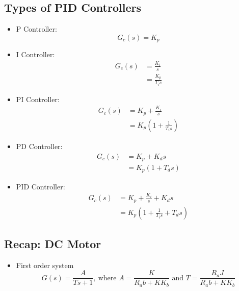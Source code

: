 \documentclass[a4paper]{article}
\begin{document}
\subsection{Types of PID Controllers}
\begin{itemize}
    \item P Controller: $$G_c(s) = K_p$$
    \item I Controller:
    \begin{align*}
        G_c(s) &= \frac{K_i}{s}\\
        &= \frac{K_p}{T_is}
    \end{align*}
    \item PI Controller: 
    \begin{align*}
        G_c(s) &= K_p+\frac{K_i}{s}\\
        &= K_p\left(1+\frac{1}{T_is}\right)
    \end{align*}
    \item PD Controller:
    \begin{align*}
        G_c(s) &= K_p+K_ds\\
        &= K_p(1+T_ds)
    \end{align*}
    \item PID Controller: 
    \begin{align*}
        G_c(s) &= K_p+\frac{K_i}{s}+K_ds\\
        &= K_p\left(1+\frac{1}{T_is}+T_ds\right)
    \end{align*}
\end{itemize}

\subsection{Recap: DC Motor}
\begin{itemize}
    \item First order system
    $$G(s) = \frac{A}{Ts+1},\ \text{where }A = \frac{K}{R_ab+KK_b} \text{ and }T=\frac{R_aJ}{R_ab+KK_b}$$
\end{itemize}
\end{document}
